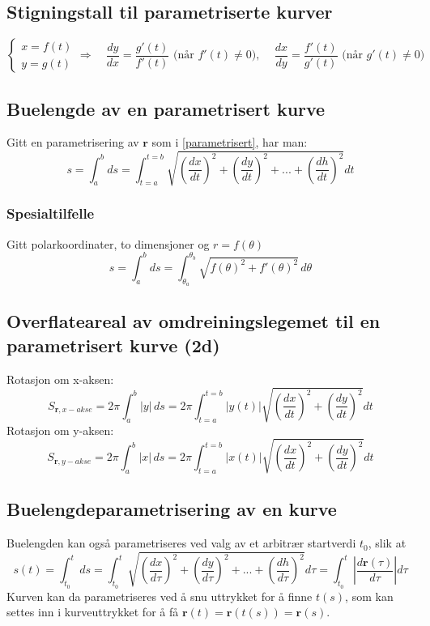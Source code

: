 \documentclass[fleqn,12pt]{wlscirep}
\begin{document}
\subsection{Stigningstall til parametriserte kurver}
\begin{equation}
    \begin{cases}
    x = f(t)\\ 
    y = g(t)
    \end{cases}
    \Longrightarrow \quad \frac{dy}{dx} = \frac{g'(t)}{f'(t)} \text{  (når } f'(t) \neq 0),\,\quad \frac{dx}{dy} = \frac{f'(t)}{g'(t)} \text{  (når } g'(t) \neq 0) \label{parametrisert}
\end{equation}
\subsection{Buelengde av en parametrisert kurve}
Gitt en parametrisering av $\textbf{r}$ som i \ref{parametrisert}, har man:
\begin{equation}
s = \int_{a}^{b} ds = \int_{t=a}^{t=b} \sqrt{\left(\frac{ dx}{dt}\right)^2 +\left(\frac{ dy}{dt}\right)^2+...+\left(\frac{dh}{dt}\right)^2} dt   
\end{equation}
\subsubsection{Spesialtilfelle}
Gitt polarkoordinater, to dimensjoner og $r = f(\theta)$
\begin{equation}
s = \int_{a}^{b} ds = \int_{\theta_a}^{\theta_b} \sqrt{f(\theta)^2 +f'(\theta)^2} \, d\theta   
\end{equation}
\subsection{Overflateareal av omdreiningslegemet til en parametrisert kurve (2d)}
Rotasjon om x-aksen:
\begin{equation}
S_{\textbf{r},x-akse} = 2\pi\int_{a}^{b}|y|\, ds = 2\pi\int_{t=a}^{t=b}|y(t)| \sqrt{\left(\frac{ dx}{dt}\right)^2 +\left(\frac{ dy}{dt}\right)^2} dt   
\end{equation}
Rotasjon om y-aksen:
\begin{equation}
S_{\textbf{r},y-akse} = 2\pi\int_{a}^{b}|x|\, ds = 2\pi\int_{t=a}^{t=b}|x(t)| \sqrt{\left(\frac{ dx}{dt}\right)^2 +\left(\frac{ dy}{dt}\right)^2} dt   
\end{equation}
\subsection{Buelengdeparametrisering av en kurve}
Buelengden kan også parametriseres ved valg av et arbitrær startverdi $t_0$, slik at
\begin{equation}
s(t) = \int_{t_0}^{t} ds = \int_{t_0}^{t} \sqrt{\left(\frac{dx}{d\tau}\right)^2 +\left(\frac{ dy}{d\tau}\right)^2+...+\left(\frac{dh}{d\tau}\right)^2} d\tau = \int_{t_0}^{t}\left|\frac{d\textbf{r}(\tau)}{d\tau}\right| d\tau  
\end{equation}
Kurven kan da parametriseres ved å snu uttrykket for å finne $t(s)$, som kan settes inn i kurveuttrykket for å få $\textbf{r}(t) = \textbf{r}(t(s)) = \textbf{r}(s)$.
\end{document}
